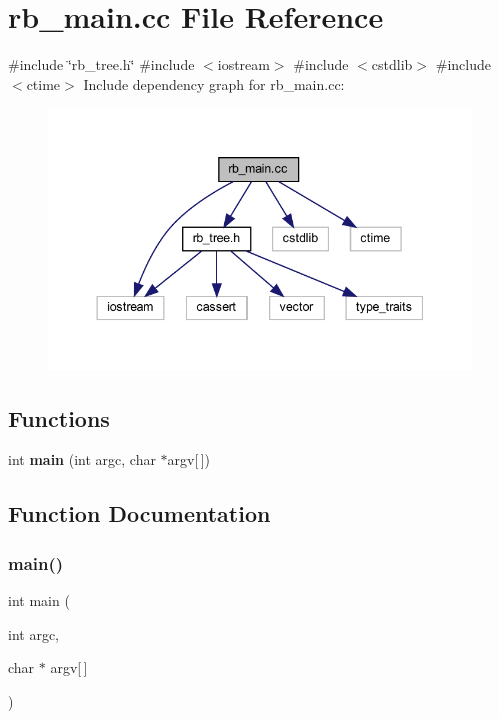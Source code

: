 \section{rb\+\_\+main.\+cc File Reference}
\label{rb__main_8cc}
{\ttfamily \#include \char`\"{}rb\+\_\+tree.\+h\char`\"{}}\newline
{\ttfamily \#include $<$iostream$>$}\newline
{\ttfamily \#include $<$cstdlib$>$}\newline
{\ttfamily \#include $<$ctime$>$}\newline
Include dependency graph for rb\+\_\+main.\+cc\+:
\nopagebreak
\begin{figure}[H]
\begin{center}
\leavevmode
\includegraphics[width=344pt]{rb__main_8cc__incl}
\end{center}
\end{figure}
\subsection*{Functions}
\begin{DoxyCompactItemize}
\item 
int \textbf{ main} (int argc, char $\ast$argv[$\,$])
\end{DoxyCompactItemize}


\subsection{Function Documentation}
\mbox{\label{rb__main_8cc_a0ddf1224851353fc92bfbff6f499fa97}} 
\subsubsection{main()}
{\footnotesize\ttfamily int main (\begin{DoxyParamCaption}\item[{int}]{argc,  }\item[{char $\ast$}]{argv[$\,$] }\end{DoxyParamCaption})}

